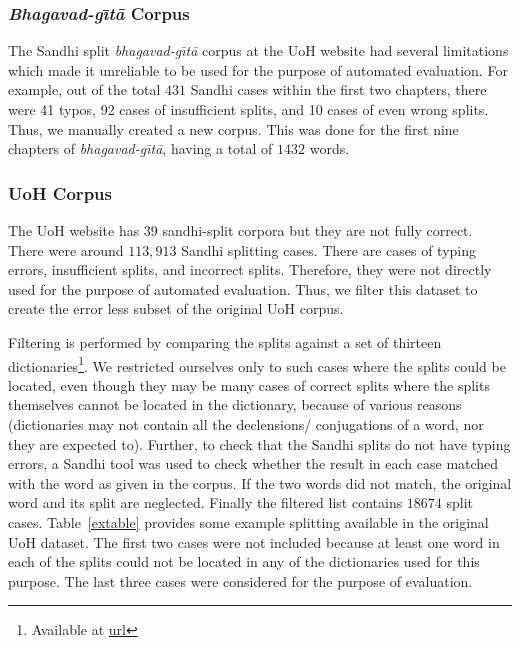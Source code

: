 \documentclass[11pt]{article}
\begin{document}
\subsubsection{\textit{Bhagavad-g\={\i}t\={a}} Corpus}
The Sandhi split \textit{bhagavad-g\={\i}t\={a}} corpus at the UoH website had several limitations which made it unreliable to be used for the purpose of automated evaluation. For example, out of the total $431$ Sandhi cases within the first two chapters, there were 41 typos, 92 cases of insufficient splits, and 10 cases of even wrong splits. Thus, we manually created a new corpus. This was done for the first nine chapters of \textit{bhagavad-g\={\i}t\={a}}, having a total of $1432$ words.

\subsubsection{UoH Corpus}
The UoH website has $39$ sandhi-split corpora but they are not fully correct. There were around $113,913$ Sandhi splitting cases. There are cases of typing errors, insufficient splits, and incorrect splits. Therefore, they were not directly used for the purpose of automated evaluation. Thus, we filter this dataset to create the error less subset of the original UoH corpus.

Filtering is performed by comparing the splits against a set of thirteen dictionaries\footnote{Available at \url{url}}. We restricted ourselves only to such cases where the splits could be located, even though they may be many cases of correct splits where the splits themselves cannot be located in the dictionary, because of various reasons (dictionaries may not contain all the declensions/ conjugations of a word, nor they are expected to). Further, to check that the Sandhi splits do not have typing errors, a Sandhi tool was used to check whether the result in each case matched with the word as given in the corpus. If the two words did not match, the original word and its split are neglected. Finally the filtered list contains $18674$ split cases. Table~\ref{extable} provides some example splitting available in the original UoH dataset. The first two cases were not included because at least one word in each of the splits could not be located in any of the dictionaries used for this purpose. The last three cases were considered for the purpose of evaluation. 
\end{document}
